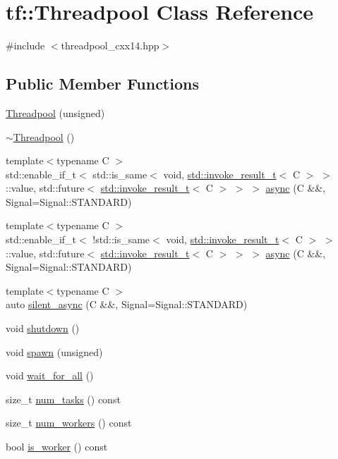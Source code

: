 \hypertarget{classtf_1_1Threadpool}{}\section{tf\+:\+:Threadpool Class Reference}
\label{classtf_1_1Threadpool}


{\ttfamily \#include $<$threadpool\+\_\+cxx14.\+hpp$>$}

\subsection*{Public Member Functions}
\begin{DoxyCompactItemize}
\item 
\hyperlink{classtf_1_1Threadpool_af2104e27f22728114bca20cce7fc04e0}{Threadpool} (unsigned)
\item 
\hyperlink{classtf_1_1Threadpool_a158e3b7a5f7e36d506fc29f119264014}{$\sim$\+Threadpool} ()
\item 
{\footnotesize template$<$typename C $>$ }\\std\+::enable\+\_\+if\+\_\+t$<$ std\+::is\+\_\+same$<$ void, \hyperlink{namespacestd_a492e7f3c5595a8b7a7c6e0c9294f5c81}{std\+::invoke\+\_\+result\+\_\+t}$<$ C $>$ $>$\+::value, std\+::future$<$ \hyperlink{namespacestd_a492e7f3c5595a8b7a7c6e0c9294f5c81}{std\+::invoke\+\_\+result\+\_\+t}$<$ C $>$ $>$ $>$ \hyperlink{classtf_1_1Threadpool_a0650bfda4fd76f5e8d9d5c35956fbeef}{async} (C \&\&, Signal=Signal\+::\+S\+T\+A\+N\+D\+A\+RD)
\item 
{\footnotesize template$<$typename C $>$ }\\std\+::enable\+\_\+if\+\_\+t$<$ !std\+::is\+\_\+same$<$ void, \hyperlink{namespacestd_a492e7f3c5595a8b7a7c6e0c9294f5c81}{std\+::invoke\+\_\+result\+\_\+t}$<$ C $>$ $>$\+::value, std\+::future$<$ \hyperlink{namespacestd_a492e7f3c5595a8b7a7c6e0c9294f5c81}{std\+::invoke\+\_\+result\+\_\+t}$<$ C $>$ $>$ $>$ \hyperlink{classtf_1_1Threadpool_a6c2cc2938ef035c303d2a43e5c15fcca}{async} (C \&\&, Signal=Signal\+::\+S\+T\+A\+N\+D\+A\+RD)
\item 
{\footnotesize template$<$typename C $>$ }\\auto \hyperlink{classtf_1_1Threadpool_a8d6b238ef8a13beb44e392c1e77e2a43}{silent\+\_\+async} (C \&\&, Signal=Signal\+::\+S\+T\+A\+N\+D\+A\+RD)
\item 
void \hyperlink{classtf_1_1Threadpool_aade7cf005cd323798e34953985515984}{shutdown} ()
\item 
void \hyperlink{classtf_1_1Threadpool_ae80574cb4394509ba3d9b47be20825f5}{spawn} (unsigned)
\item 
void \hyperlink{classtf_1_1Threadpool_ad3c5d9917ee85cb792f464419dceba38}{wait\+\_\+for\+\_\+all} ()
\item 
size\+\_\+t \hyperlink{classtf_1_1Threadpool_ac6b0f5ffa732c877d03a80d40df34455}{num\+\_\+tasks} () const
\item 
size\+\_\+t \hyperlink{classtf_1_1Threadpool_af593a543c7d77229cf9a344b0f15b9f3}{num\+\_\+workers} () const
\item 
bool \hyperlink{classtf_1_1Threadpool_a7aaf377c9298f4b09a59af4a960a32ec}{is\+\_\+worker} () const
\end{DoxyCompactItemize}


